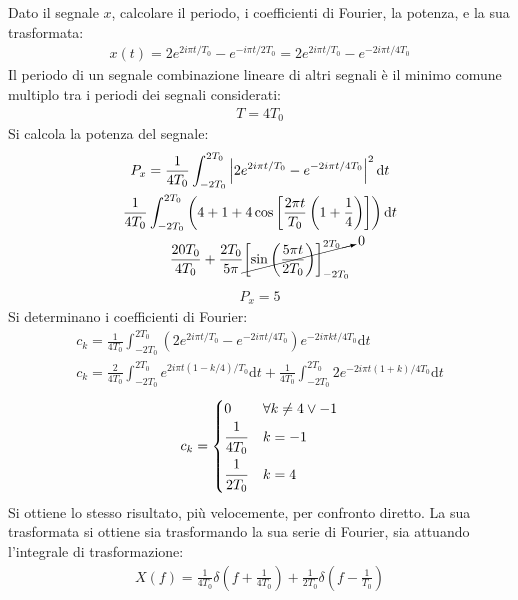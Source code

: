 \documentclass{article}
\newcommand{\df}{\mathrm{d}}
\begin{document}
Dato il segnale $x$, calcolare il periodo, i coefficienti di Fourier, la potenza, e la sua trasformata:
\begin{gather*}
    x(t)=2e^{2i\pi t/T_0}-e^{-i\pi t/2T_0}=2e^{2i\pi t/T_0}-e^{-2i\pi t/4T_0}
\end{gather*}
Il periodo di un segnale combinazione lineare di altri segnali è il minimo comune multiplo tra i periodi dei segnali considerati:
\begin{gather}
    T=4T_0
\end{gather}
Si calcola la potenza del segnale:
\begin{gather*}
    P_x=\displaystyle\frac{1}{4T_0}\int_{-2T_0}^{2T_0}\left|2e^{2i\pi t/T_0}-e^{-2i\pi t/4T_0}\right|^2\df t\\
    \displaystyle\frac{1}{4T_0}\int_{-2T_0}^{2T_0}\left(4+1+4\cos\left[\frac{2\pi t}{T_0}\left(1+\frac{1}{4}\right)\right]\right)\df t\\
    \displaystyle\frac{20T_0}{4T_0}+\frac{2T_0}{5\pi }\cancelto{0}{\left[\sin\left(\frac{5\pi t}{2T_0}\right)\right]_{-2T_0}^{2T_0}}
\end{gather*}
\begin{gather}
    P_x=5
\end{gather}
Si determinano i coefficienti di Fourier:
\begin{gather*}
    c_k=\displaystyle\frac{1}{4T_0}\int_{-2T_0}^{2T_0}\left(2e^{2i\pi t/T_0}-e^{-2i\pi t/4T_0}\right)e^{-2i\pi kt/4T_0}\df t\\
    c_k=\displaystyle\frac{2}{4T_0}\int_{-2T_0}^{2T_0}e^{2i\pi t(1-k/4)/T_0}\df t+\frac{1}{4T_0}\int_{-2T_0}^{2T_0}2e^{-2i\pi t(1+k)/4T_0}\df t
\end{gather*}
\begin{gather}
    c_k=\begin{cases}
        0 &\forall k\neq4\lor-1\\
        \displaystyle\frac{\strut 1}{\strut 4T_0}& k=-1\\
        \displaystyle\frac{\strut 1}{\strut 2T_0}&k=4
    \end{cases}
\end{gather}
Si ottiene lo stesso risultato, più velocemente, per confronto diretto. La sua trasformata si ottiene sia trasformando la sua serie di Fourier, sia attuando l'integrale 
di trasformazione:
\begin{gather}
    X(f)=\displaystyle\frac{1}{4T_0}\delta\left(f+\frac{1}{4T_0}\right)+\frac{1}{2T_0}\delta\left(f-\frac{1}{T_0}\right)
\end{gather}
\end{document}
